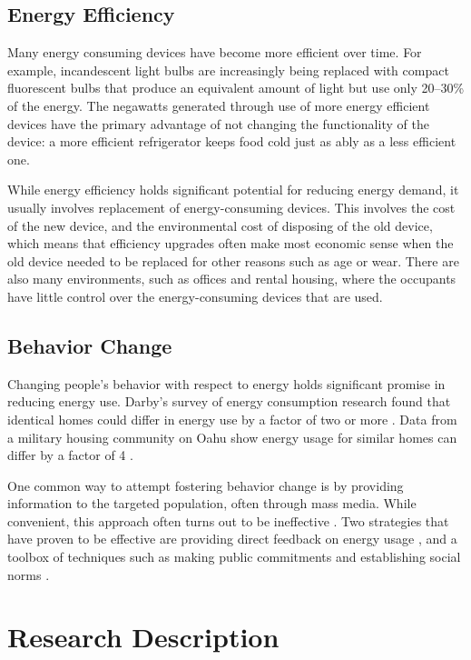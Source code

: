 \subsection{Energy Efficiency}

Many energy consuming devices have become more efficient over time. For example, incandescent light bulbs are increasingly being replaced with compact fluorescent bulbs that produce an equivalent amount of light but use only 20--30\% of the energy. The negawatts generated through use of more energy efficient devices have the primary advantage of not changing the functionality of the device: a more efficient refrigerator keeps food cold just as ably as a less efficient one.

While energy efficiency holds significant potential for reducing energy demand, it usually involves replacement of energy-consuming devices. This involves the cost of the new device, and the environmental cost of disposing of the old device, which means that efficiency upgrades often make most economic sense when the old device needed to be replaced for other reasons such as age or wear. There are also many environments, such as offices and rental housing, where the occupants have little control over the energy-consuming devices that are used.

\subsection{Behavior Change}

Changing people's behavior with respect to energy holds significant promise in reducing energy use. Darby's survey of energy consumption research found that identical homes could differ in energy use by a factor of two or more \cite{darby-review-2006}. Data from a military housing community on Oahu show energy usage for similar homes can differ by a factor of 4 \cite{Norton2010ZeroEnergyHomes}.

One common way to attempt fostering behavior change is by providing information to the targeted population, often through mass media. While convenient, this approach often turns out to be ineffective \cite{McKenzie-Mohr2009}. Two strategies that have proven to be effective are providing direct feedback on energy usage \cite{darby-review-2006}, and a toolbox of techniques such as making public commitments and establishing social norms \cite{McKenzie-Mohr2009}. 


\section{Research Description}

